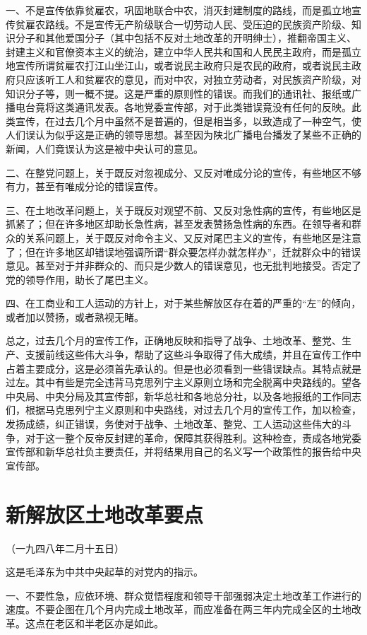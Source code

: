 \documentclass[UTF-8, a5paper, 12pt]{ctexart}
\begin{document}
一、不是宣传依靠贫雇农，巩固地联合中农，消灭封建制度的路线，而是孤立地宣传贫雇农路线。不是宣传无产阶级联合一切劳动人民、受压迫的民族资产阶级、知识分子和其他爱国分子（其中包括不反对土地改革的开明绅士），推翻帝国主义、封建主义和官僚资本主义的统治，建立中华人民共和国和人民民主政府，而是孤立地宣传所谓贫雇农打江山坐江山，或者说民主政府只是农民的政府，或者说民主政府只应该听工人和贫雇农的意见，而对中农，对独立劳动者，对民族资产阶级，对知识分子等，则一概不提。这是严重的原则性的错误。而我们的通讯社、报纸或广播电台竟将这类通讯发表。各地党委宣传部，对于此类错误竟没有任何的反映。此类宣传，在过去几个月中虽然不是普遍的，但是相当多，以致造成了一种空气，使人们误认为似乎这是正确的领导思想。甚至因为陕北广播电台播发了某些不正确的新闻，人们竟误认为这是被中央认可的意见。

二、在整党问题上，关于既反对忽视成分、又反对唯成分论的宣传，有些地区不够有力，甚至有唯成分论的错误宣传。

三、在土地改革问题上，关于既反对观望不前、又反对急性病的宣传，有些地区是抓紧了；但在许多地区却助长急性病，甚至发表赞扬急性病的东西。在领导者和群众的关系问题上，关于既反对命令主义、又反对尾巴主义的宣传，有些地区是注意了；但在许多地区却错误地强调所谓“群众要怎样办就怎样办”，迁就群众中的错误意见。甚至对于并非群众的、而只是少数人的错误意见，也无批判地接受。否定了党的领导作用，助长了尾巴主义。

四、在工商业和工人运动的方针上，对于某些解放区存在着的严重的“左”的倾向，或者加以赞扬，或者熟视无睹。

总之，过去几个月的宣传工作，正确地反映和指导了战争、土地改革、整党、生产、支援前线这些伟大斗争，帮助了这些斗争取得了伟大成绩，并且在宣传工作中占着主要成分，这是必须首先承认的。但是也必须看到一些错误缺点。其特点就是过左。其中有些是完全违背马克思列宁主义原则立场和完全脱离中央路线的。望各中央局、中央分局及其宣传部，新华总社和各地总分社，以及各地报纸的工作同志们，根据马克思列宁主义原则和中央路线，对过去几个月的宣传工作，加以检查，发扬成绩，纠正错误，务使对于战争、土地改革、整党、工人运动这些伟大的斗争，对于这一整个反帝反封建的革命，保障其获得胜利。这种检查，责成各地党委宣传部和新华总社负主要责任，并将结果用自己的名义写一个政策性的报告给中央宣传部。 

\section{新解放区土地改革要点}

（一九四八年二月十五日）

这是毛泽东为中共中央起草的对党内的指示。

一、不要性急，应依环境、群众觉悟程度和领导干部强弱决定土地改革工作进行的速度。不要企图在几个月内完成土地改革，而应准备在两三年内完成全区的土地改革。这点在老区和半老区亦是如此。
\end{document}
